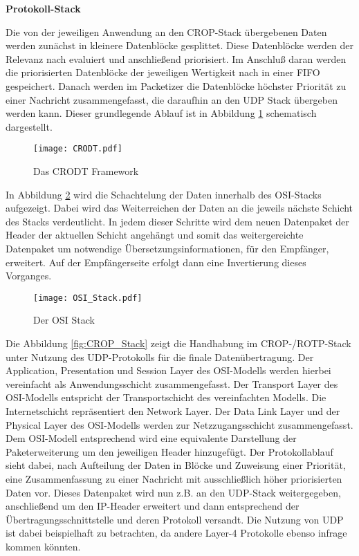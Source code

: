 \textbf{Protokoll-Stack} \label{sec:Konzept_Protocolstack}

Die von der jeweiligen Anwendung an den \gls{CROP}-Stack {\"u}bergebenen Daten
werden zun{\"a}chst in kleinere Datenbl{\"o}cke gesplittet. Diese Datenbl{\"o}cke
werden der Relevanz nach evaluiert und anschlie{\ss}end priorisiert.
Im Anschlu{\ss} daran werden die priorisierten Datenbl{\"o}cke der jeweiligen
Wertigkeit nach in einer \gls{FIFO} gespeichert. Danach werden im
Packetizer die Datenbl{\"o}cke h{\"o}chster Priorit{\"a}t zu einer
Nachricht zusammengefasst, die daraufhin an den \gls{UDP} Stack {\"u}bergeben
werden kann. Dieser grundlegende Ablauf ist in Abbildung \ref{fig:CRODT} schematisch
dargestellt.

\begin{figure}[H]
	\centering
	\texttt{[image: CRODT.pdf]}
	\caption[Das CRODT Framework]{Das CRODT Framework \cite{Daher}}
	\label{fig:CRODT}
\end{figure}

In Abbildung \ref{fig:OSI_Stack} wird die Schachtelung der Daten
innerhalb des OSI-Stacks aufgezeigt. Dabei wird das Weiterreichen der Daten an
die jeweils n{\"a}chste Schicht des Stacks verdeutlicht. In jedem dieser Schritte wird dem neuen
Datenpaket der Header der aktuellen Schicht angeh{\"a}ngt und somit das
weitergereichte Datenpaket um notwendige {\"U}bersetzungsinformationen, f{\"u}r
den Empf{\"a}nger, erweitert. Auf der Empf{\"a}ngerseite erfolgt dann eine
Invertierung dieses Vorganges. 

\begin{figure}[H]
	\centering
	\texttt{[image: OSI\_Stack.pdf]}
	\caption{Der OSI Stack}
	\label{fig:OSI_Stack}
\end{figure}
 
Die Abbildung \ref{fig:CROP_Stack} zeigt die Handhabung im CROP-/ROTP-Stack
unter Nutzung des \gls{UDP}-Protokolls f{\"u}r die finale Daten{\"u}bertragung. Der
Application, Presentation und Session Layer des OSI-Modells
werden hierbei vereinfacht als Anwendungsschicht zusammengefasst.
Der Transport Layer des OSI-Modells entspricht der Transportschicht des
vereinfachten Modells. Die Internetschicht repr{\"a}sentiert den Network
Layer.
Der Data Link Layer und der Physical Layer des OSI-Modells werden zur
Netzzugangsschicht zusammengefasst. Dem OSI-Modell entsprechend wird eine
equivalente Darstellung der Paketerweiterung um den jeweiligen Header
hinzugef{\"u}gt. Der Protokollablauf sieht dabei, nach Aufteilung der Daten in
Bl{\"o}cke und Zuweisung einer Priorit{\"a}t, eine Zusammenfassung zu einer
Nachricht mit ausschließlich höher priorisierten Daten vor. Dieses Datenpaket
wird nun z.B. an den \gls{UDP}-Stack weitergegeben, anschlie{\ss}end um den
\gls{IP}-Header erweitert und dann entsprechend der
{\"U}bertragungsschnittstelle und deren Protokoll versandt. Die Nutzung von UDP
ist dabei beispielhaft zu betrachten, da andere Layer-4 Protokolle ebenso
infrage kommen k{\"o}nnten.


